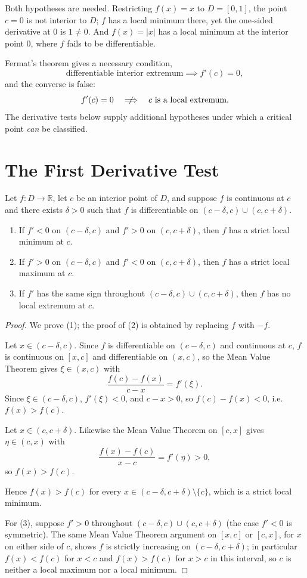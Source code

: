 \documentclass{essay}
\begin{document}
Both hypotheses are needed. Restricting \(f(x)=x\) to \(D=[0,1]\), the point
\(c=0\) is not interior to \(D\); \(f\) has a local minimum there, yet the
one-sided derivative at \(0\) is \(1\neq 0\). And \(f(x)=|x|\) has a local
minimum at the interior point \(0\), where \(f\) fails to be differentiable.

Fermat's theorem gives a necessary condition,
\[
\text{differentiable interior extremum} \implies f'(c)=0,
\]
and the converse is false:
\[
f'(c)=0 \quad\centernot\Longrightarrow\quad c \text{ is a local extremum}.
\]
The derivative tests below supply additional hypotheses under which a
critical point \emph{can} be classified.

\section{The First Derivative Test}

\begin{theorem}
Let \(f:D\to\mathbb{R}\), let \(c\) be an interior point of \(D\), and
suppose \(f\) is continuous at \(c\) and there exists \(\delta>0\) such that
\(f\) is differentiable on \((c-\delta,c)\cup(c,c+\delta)\).
\begin{enumerate}
    \item If \(f'<0\) on \((c-\delta,c)\) and \(f'>0\) on \((c,c+\delta)\),
    then \(f\) has a strict local minimum at \(c\).
    \item If \(f'>0\) on \((c-\delta,c)\) and \(f'<0\) on \((c,c+\delta)\),
    then \(f\) has a strict local maximum at \(c\).
    \item If \(f'\) has the same sign throughout \((c-\delta,c)\cup(c,c+\delta)\),
    then \(f\) has no local extremum at \(c\).
\end{enumerate}
\end{theorem}

\begin{proof}
We prove (1); the proof of (2) is obtained by replacing \(f\) with \(-f\).

Let \(x\in(c-\delta,c)\). Since \(f\) is differentiable on \((c-\delta,c)\)
and continuous at \(c\), \(f\) is continuous on \([x,c]\) and differentiable
on \((x,c)\), so the Mean Value Theorem gives \(\xi\in(x,c)\) with
\[
\frac{f(c)-f(x)}{c-x}=f'(\xi).
\]
Since \(\xi\in(c-\delta,c)\), \(f'(\xi)<0\), and \(c-x>0\), so
\(f(c)-f(x)<0\), i.e.\ \(f(x)>f(c)\).

Let \(x\in(c,c+\delta)\). Likewise the Mean Value Theorem on \([c,x]\) gives
\(\eta\in(c,x)\) with
\[
\frac{f(x)-f(c)}{x-c}=f'(\eta)>0,
\]
so \(f(x)>f(c)\).

Hence \(f(x)>f(c)\) for every \(x\in(c-\delta,c+\delta)\setminus\{c\}\), which
is a strict local minimum.

For (3), suppose \(f'>0\) throughout \((c-\delta,c)\cup(c,c+\delta)\) (the
case \(f'<0\) is symmetric). The same Mean Value Theorem argument on
\([x,c]\) or \([c,x]\), for \(x\) on either side of \(c\), shows \(f\) is
strictly increasing on \((c-\delta,c+\delta)\); in particular \(f(x)<f(c)\)
for \(x<c\) and \(f(x)>f(c)\) for \(x>c\) in this interval, so \(c\) is
neither a local maximum nor a local minimum.
\end{proof}
\end{document}
